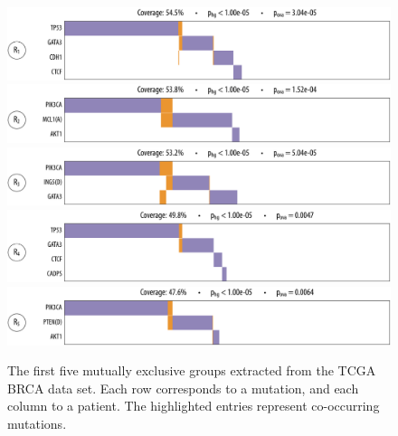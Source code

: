 \begin{figure}[htbp]
\centering
\includegraphics[width=\textwidth]{figures/genes/brca_1.pdf}\\[2em]
\includegraphics[width=\textwidth]{figures/genes/brca_6.pdf}\\[2em]
\includegraphics[width=\textwidth]{figures/genes/brca_8.pdf}\\[2em]
\includegraphics[width=\textwidth]{figures/genes/brca_2.pdf}\\[2em]
\includegraphics[width=\textwidth]{figures/genes/brca_5.pdf}\\[2em]
\caption{The first five mutually exclusive groups extracted from the TCGA BRCA data set.
Each row corresponds to a mutation, and each column to a patient.
The highlighted entries represent co-occurring mutations.}
\label{fig:rep_brca_1}
\end{figure}

